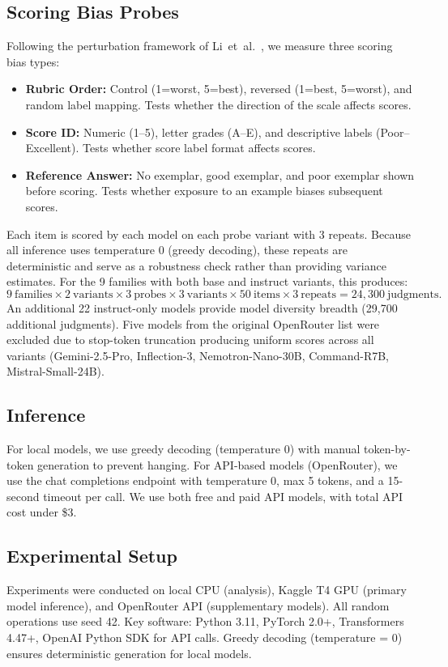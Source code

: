 \documentclass[11pt,twocolumn]{article}
\begin{document}
\subsection{Scoring Bias Probes}
Following the perturbation framework of Li~et~al.~\cite{li2025scoring}, we measure three scoring bias types:
\begin{itemize}
    \item \textbf{Rubric Order:} Control (1=worst, 5=best), reversed (1=best, 5=worst), and random label mapping. Tests whether the direction of the scale affects scores.
    \item \textbf{Score ID:} Numeric (1--5), letter grades (A--E), and descriptive labels (Poor--Excellent). Tests whether score label format affects scores.
    \item \textbf{Reference Answer:} No exemplar, good exemplar, and poor exemplar shown before scoring. Tests whether exposure to an example biases subsequent scores.
\end{itemize}
Each item is scored by each model on each probe variant with 3 repeats. Because all inference uses temperature 0 (greedy decoding), these repeats are deterministic and serve as a robustness check rather than providing variance estimates. For the 9 families with both base and instruct variants, this produces:
\[
9~\text{families} \times 2~\text{variants} \times 3~\text{probes} \times 3~\text{variants} \times 50~\text{items} \times 3~\text{repeats} = 24,300~\text{judgments}.
\]
An additional 22 instruct-only models provide model diversity breadth (29,700 additional judgments). Five models from the original OpenRouter list were excluded due to stop-token truncation producing uniform scores across all variants (Gemini-2.5-Pro, Inflection-3, Nemotron-Nano-30B, Command-R7B, Mistral-Small-24B).

\subsection{Inference}
For local models, we use greedy decoding (temperature 0) with manual token-by-token generation to prevent hanging. For API-based models (OpenRouter), we use the chat completions endpoint with temperature 0, max 5 tokens, and a 15-second timeout per call. We use both free and paid API models, with total API cost under \$3.

\subsection{Experimental Setup}
Experiments were conducted on local CPU (analysis), Kaggle T4 GPU (primary model inference), and OpenRouter API (supplementary models). All random operations use seed 42. Key software: Python 3.11, PyTorch 2.0+, Transformers 4.47+, OpenAI Python SDK for API calls. Greedy decoding (temperature = 0) ensures deterministic generation for local models.
\end{document}
